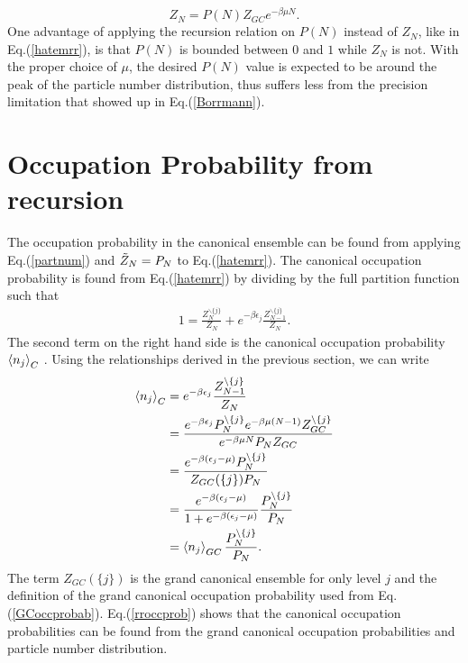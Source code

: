 \begin{equation}
    Z_N=P(N) Z_{GC} e^{-\beta\mu N}. \label{ZCasZGC}
\end{equation}
One advantage of applying the recursion relation on $P(N)$ instead of $Z_N$, like in Eq.\@ (\ref{hatemrr}), is that $P(N)$ is bounded between $0$ and $1$ while $Z_N$ is not. With the proper choice of $\mu$, the desired $P(N)$ value is expected to be around the peak of the particle number distribution, thus suffers less from the precision limitation that showed up in Eq.\@ (\ref{Borrmann}). 



\section{Occupation Probability from recursion}
The occupation probability in the canonical ensemble can be found from applying Eq.\@ (\ref{partnum}) and $\Tilde{Z}_N=P_N$ to Eq.\@ (\ref{hatemrr}). The canonical occupation probability is found from Eq.\@ (\ref{hatemrr}) by dividing by the full partition function such that 
\begin{align}
    1=\frac{Z_N^{\backslash\{j\}}}{Z_N}+e^{-\beta\epsilon_j}\frac{Z_{N-1}^{\backslash\{j\}}}{Z_N}.
\end{align}
The second term on the right hand side is the canonical occupation probability $\left<{n_j}\right>_C$ \cite{Hatem2020}. Using the relationships derived in the previous section, we can write
\begin{align}
    \left<{n_j}\right>_C&=e^{-\beta\epsilon_j}\frac{Z_{N-1}^{\backslash\{j\}}}{Z_N}\nonumber\\
    &=\frac{e^{-\beta\epsilon_j}P_N^{\backslash\{j\}}e^{-\beta\mu(N-1)}Z_{GC}^{\backslash\{j\}}}{e^{-\beta\mu N} P_N Z_{GC}}\nonumber\\
    &=\frac{e^{-\beta(\epsilon_j-\mu)} P_N^{\backslash\{j\}}}{Z_{GC}(\{j\}) P_N}\nonumber\\
    &=\frac{e^{-\beta(\epsilon_j-\mu)}}{1+e^{-\beta(\epsilon_j-\mu)}} \frac{P_N^{\backslash\{j\}}}{P_N}\nonumber\\
    &=\left<{n_j}\right>_{GC} \frac{P_N^{\backslash\{j\}}}{P_N}. \label{rroccprob}
\end{align}
The term $Z_{GC}(\{j\})$ is the grand canonical ensemble for only level $j$ and the definition of the grand canonical occupation probability used from Eq.\@ (\ref{GCoccprobab}). Eq.\@ (\ref{rroccprob}) shows that the canonical occupation probabilities can be found from the grand canonical occupation probabilities and particle number distribution. 



